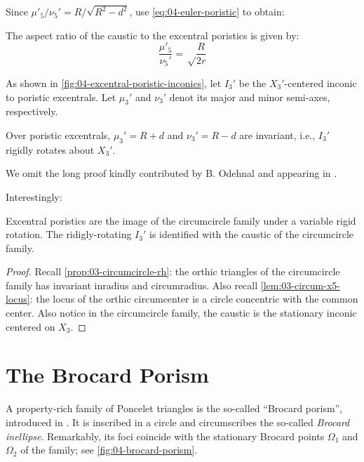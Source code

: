 Since $\mu'_5/\nu_5'=R/\sqrt{R^2-d^2}$, use \cref{eq:04-euler-poristic} to obtain:

\begin{corollary}
The aspect ratio of the caustic to the excentral poristics is given by:
\begin{equation*}
 \frac{\mu'_5}{\nu_5'}={\sqrt\frac{R}{2 r}}
\end{equation*}
\end{corollary}

As shown in \cref{fig:04-excentral-poristic-inconics}, let $I_3'$ be the $X_3'$-centered inconic to poristic excentrals. Let $\mu_3'$ and $\nu_3'$ denot its major and minor semi-axes, respectively.

\begin{proposition}
Over poristic excentrals,  $\mu_3'=R+d$ and $\nu_3'=R-d$ are invariant, i.e., $I_3'$ rigidly rotates about $X_3'$.
\label{prop:04-inconic-x3p}
\end{proposition}

We omit the long proof kindly contributed by B. Odehnal and appearing in \cite[Appendix C]{garcia2020-similarity-I}.

Interestingly:

\begin{theorem}
Excentral poristics are the image of the circumcircle family under a variable rigid rotation. The ridigly-rotating $I_3'$ is identified with the caustic of the circumcircle family.
\end{theorem} 

\begin{proof}
Recall \cref{prop:03-circumcircle-rh}: the orthic triangles of the circumcircle family has invariant inradius and circumradius. Also recall \cref{lem:03-circum-x5-locus}: the locus of the orthic circumcenter is a circle concentric with the common center. Also notice in the circumcircle family, the caustic is the stationary inconic centered on $X_3$.
\end{proof}

\section{The Brocard Porism}
 
A property-rich family of Poncelet triangles is the so-called ``Brocard porism'', introduced in  \cite{bradley2007-brocard,shail1996-brocard, bradley2011-brocard}. It is inscribed in a circle and circumscribes the so-called {\em Brocard inellipse}. Remarkably, its foci coincide with the stationary Brocard points $\Omega_1$ and $\Omega_2$ of the family; see \cref{fig:04-brocard-porism}.


